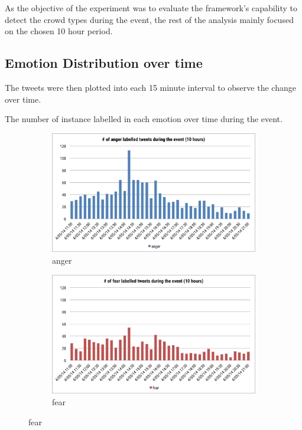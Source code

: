 As the objective of the experiment was to evaluate the framework's capability to detect the crowd types during the event, the rest of the analysis mainly focused on the chosen 10 hour period.

\subsection{Emotion Distribution over time}
The tweets were then plotted into each 15 minute interval to observe the change over time.

The number of instance labelled in each emotion over time during the event.
\begin{figure}[htb!] 
\centering
\begin{subfigure}{0.5\textwidth}
\centering
\includegraphics[width=0.98\linewidth]{AngerInstanceEvent}
\caption{anger}
\label{fig:angerInstanceEvent}
\end{subfigure}%
\begin{subfigure}{0.5\textwidth}
\centering    
\includegraphics[width=0.98\linewidth]{FearInstanceEvent}
\caption{fear}
\label{fig:fearInstanceEvent}
\end{subfigure}


\end{figure}

